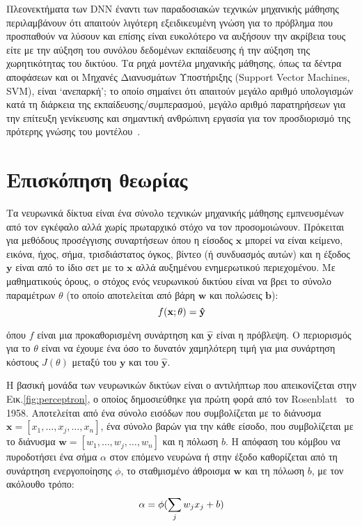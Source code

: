 Πλεονεκτήματα των DNN έναντι των παραδοσιακών τεχνικών μηχανικής μάθησης περιλαμβάνουν ότι απαιτούν λιγότερη εξειδικευμένη γνώση για το πρόβλημα που προσπαθούν να λύσουν και επίσης είναι ευκολότερο να αυξήσουν την ακρίβεια τους είτε με την αύξηση του συνόλου δεδομένων εκπαίδευσης ή την αύξηση της χωρητικότητας του δικτύου.
Τα ρηχά μοντέλα μηχανικής μάθησης, όπως τα δέντρα αποφάσεων και οι Μηχανές Διανυσμάτων Υποστήριξης (Support Vector Machines, SVM), είναι `ανεπαρκή'; το οποίο σημαίνει ότι απαιτούν μεγάλο αριθμό υπολογισμών κατά τη διάρκεια της εκπαίδευσης/συμπερασμού, μεγάλο αριθμό παρατηρήσεων για την επίτευξη γενίκευσης και σημαντική ανθρώπινη εργασία για τον προσδιορισμό της πρότερης γνώσης του μοντέλου~\cite{bengio2007scaling}.

\section{Επισκόπηση θεωρίας}
Τα νευρωνικά δίκτυα είναι ένα σύνολο τεχνικών μηχανικής μάθησης εμπνευσμένων από τον εγκέφαλο αλλά χωρίς πρωταρχικό στόχο να τον προσομοιώνουν.
Πρόκειται για μεθόδους προσέγγισης συναρτήσεων όπου η είσοδος $\mathbf{x}$ μπορεί να είναι κείμενο, εικόνα, ήχος, σήμα, τρισδιάστατος όγκος, βίντεο (ή συνδυασμός αυτών) και η έξοδος $\mathbf{y}$ είναι από το ίδιο σετ με το $\mathbf{x}$ αλλά αυξημένου ενημερωτικού περιεχομένου.
Με μαθηματικούς όρους, ο στόχος ενός νευρωνικού δικτύου είναι να βρει το σύνολο παραμέτρων $\theta$ (το οποίο αποτελείται από βάρη $\mathbf{w}$ και πολώσεις $\mathbf{b}$):
\begin{equation}
	\centering
	f(\mathbf{x};\mathbf{\theta}) = \mathbf{\hat{y}}
\end{equation}

\noindent
όπου $f$ είναι μια προκαθορισμένη συνάρτηση και $\mathbf{\hat{y}}$ είναι η πρόβλεψη.
Ο περιορισμός για το $\theta$ είναι να έχουμε ένα όσο το δυνατόν χαμηλότερη τιμή για μια συνάρτηση κόστους $J(\theta)$ μεταξύ του $\mathbf{y}$ και του $\mathbf{\hat{y}}$.

Η βασική μονάδα των νευρωνικών δικτύων είναι ο αντιλήπτωρ που απεικονίζεται στην Εικ.\ref{fig:perceptron}, ο οποίος δημοσιεύθηκε για πρώτη φορά από τον Rosenblatt~\cite{rosenblatt1958perceptron} το 1958.
Αποτελείται από ένα σύνολο εισόδων που συμβολίζεται με το διάνυσμα $\mathbf{x}=[x_1, \ldots, x_j, \ldots, x_n]$, ένα σύνολο βαρών για την κάθε είσοδο, που συμβολίζεται με το διάνυσμα $\mathbf{w}=[w_1, \ldots, w_j, \ldots, w_n]$ και η πόλωση $b$.
Η απόφαση του κόμβου να πυροδοτήσει ένα σήμα $\alpha$ στον επόμενο νευρώνα ή στην έξοδο καθορίζεται από τη συνάρτηση ενεργοποίησης $\phi$, το σταθμισμένο άθροισμα $\mathbf{w}$ και τη πόλωση $b$, με τον ακόλουθο τρόπο:
\begin{equation}
	\centering
	\alpha = \phi(\sum\limits_{j} w_{j}x_{j} + b)
\end{equation}

